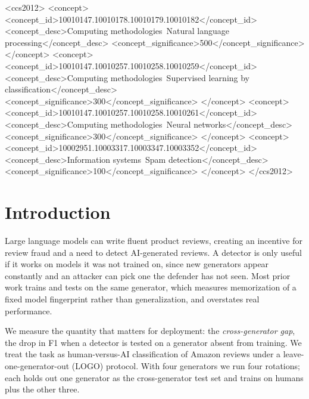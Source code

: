 \documentclass[manuscript,nonacm]{acmart}
\begin{document}
\begin{CCSXML}
<ccs2012>
 <concept>
  <concept_id>10010147.10010178.10010179.10010182</concept_id>
  <concept_desc>Computing methodologies~Natural language processing</concept_desc>
  <concept_significance>500</concept_significance>
 </concept>
 <concept>
  <concept_id>10010147.10010257.10010258.10010259</concept_id>
  <concept_desc>Computing methodologies~Supervised learning by classification</concept_desc>
  <concept_significance>300</concept_significance>
 </concept>
 <concept>
  <concept_id>10010147.10010257.10010258.10010261</concept_id>
  <concept_desc>Computing methodologies~Neural networks</concept_desc>
  <concept_significance>300</concept_significance>
 </concept>
 <concept>
  <concept_id>10002951.10003317.10003347.10003352</concept_id>
  <concept_desc>Information systems~Spam detection</concept_desc>
  <concept_significance>100</concept_significance>
 </concept>
</ccs2012>
\end{CCSXML}



\maketitle

\section{Introduction}

Large language models can write fluent product reviews, creating an incentive
for review fraud and a need to detect AI-generated reviews. A detector is only
useful if it works on models it was not trained on, since new generators appear
constantly and an attacker can pick one the defender has not seen. Most prior
work trains and tests on the same generator, which measures memorization of a
fixed model fingerprint rather than generalization, and overstates real
performance.

We measure the quantity that matters for deployment: the \emph{cross-generator
gap}, the drop in F1 when a detector is tested on a generator absent from
training. We treat the task as human-versus-AI classification of Amazon reviews
under a leave-one-generator-out (LOGO) protocol. With four generators we run
four rotations; each holds out one generator as the cross-generator test set and
trains on humans plus the other three.
\end{document}
